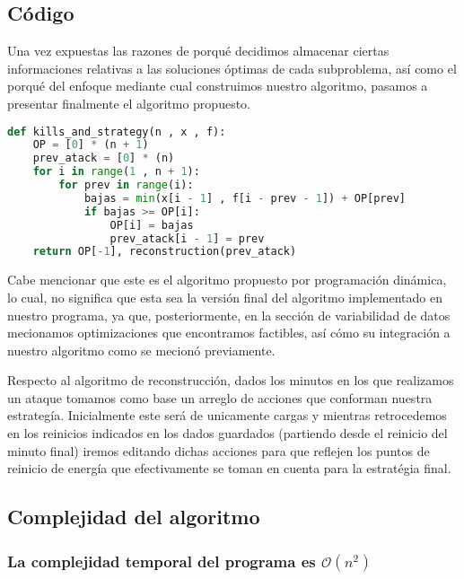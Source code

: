 \subsection{Código}
Una vez expuestas las razones de porqué decidimos almacenar ciertas informaciones relativas a las soluciones óptimas de cada subproblema, así como el porqué del enfoque mediante cual construimos nuestro algoritmo, pasamos a presentar finalmente el algoritmo propuesto.

\begin{lstlisting}[language=Python]
def kills_and_strategy(n , x , f):
    OP = [0] * (n + 1)
    prev_atack = [0] * (n)
    for i in range(1 , n + 1):
        for prev in range(i):
            bajas = min(x[i - 1] , f[i - prev - 1]) + OP[prev]
            if bajas >= OP[i]:
                OP[i] = bajas
                prev_atack[i - 1] = prev
    return OP[-1], reconstruction(prev_atack)
\end{lstlisting}

Cabe mencionar que este es el algoritmo propuesto por programación dinámica, lo cual, no significa que esta sea la versión final del algoritmo implementado en nuestro programa, ya que, posteriormente, en la sección de variabilidad de datos mecionamos optimizaciones que encontramos factibles, así cómo su integración a nuestro algoritmo como se mecionó previamente.  


Respecto al algoritmo de reconstrucción, dados los minutos en los que realizamos un ataque tomamos como base un arreglo de acciones que conforman nuestra estrategía. Inicialmente este será de unicamente cargas y mientras retrocedemos en los reinicios indicados en los dados guardados (partiendo desde el reinicio del minuto final) iremos editando dichas acciones para que reflejen los puntos de reinicio de energía que efectivamente se toman en cuenta para la estratégia final. 

\subsection{Complejidad del algoritmo}\label{sec:complexity}

\subsubsection{La complejidad temporal del programa  es  $\mathcal{O}(n^{2})$ }
